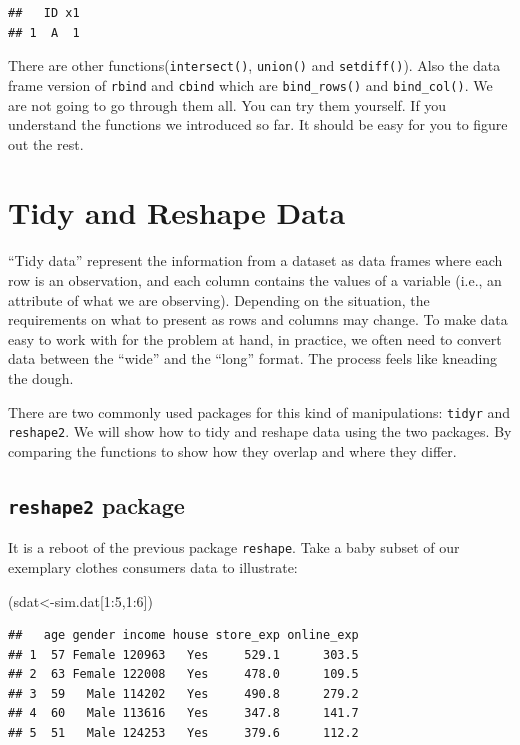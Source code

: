 \documentclass[12pt,]{krantz}
\newenvironment{Shaded}{\begin{snugshade}}{\end{snugshade}}
\newcommand{\DecValTok}[1]{\textcolor[rgb]{0.00,0.00,0.81}{{#1}}}
\newcommand{\NormalTok}[1]{{#1}}
\theoremstyle{definition}
\theoremstyle{definition}
\theoremstyle{remark}
\begin{document}
\begin{verbatim}
##   ID x1
## 1  A  1
\end{verbatim}

There are other functions(\texttt{intersect()}, \texttt{union()} and
\texttt{setdiff()}). Also the data frame version of \texttt{rbind} and
\texttt{cbind} which are \texttt{bind\_rows()} and \texttt{bind\_col()}.
We are not going to go through them all. You can try them yourself. If
you understand the functions we introduced so far. It should be easy for
you to figure out the rest.

\section{Tidy and Reshape Data}\label{tidy-and-reshape-data}

``Tidy data'' represent the information from a dataset as data frames
where each row is an observation, and each column contains the values of
a variable (i.e., an attribute of what we are observing). Depending on
the situation, the requirements on what to present as rows and columns
may change. To make data easy to work with for the problem at hand, in
practice, we often need to convert data between the ``wide'' and the
``long'' format. The process feels like kneading the dough.

There are two commonly used packages for this kind of manipulations:
\texttt{tidyr} and \texttt{reshape2}. We will show how to tidy and
reshape data using the two packages. By comparing the functions to show
how they overlap and where they differ.

\subsection{\texorpdfstring{\texttt{reshape2}
package}{reshape2 package}}\label{reshape2-package}

It is a reboot of the previous package \texttt{reshape}. Take a baby
subset of our exemplary clothes consumers data to illustrate:

\begin{Shaded}
\begin{Highlighting}[]
\NormalTok{(sdat<-sim.dat[}\DecValTok{1}\NormalTok{:}\DecValTok{5}\NormalTok{,}\DecValTok{1}\NormalTok{:}\DecValTok{6}\NormalTok{])}
\end{Highlighting}
\end{Shaded}

\begin{verbatim}
##   age gender income house store_exp online_exp
## 1  57 Female 120963   Yes     529.1      303.5
## 2  63 Female 122008   Yes     478.0      109.5
## 3  59   Male 114202   Yes     490.8      279.2
## 4  60   Male 113616   Yes     347.8      141.7
## 5  51   Male 124253   Yes     379.6      112.2
\end{verbatim}
\end{document}
